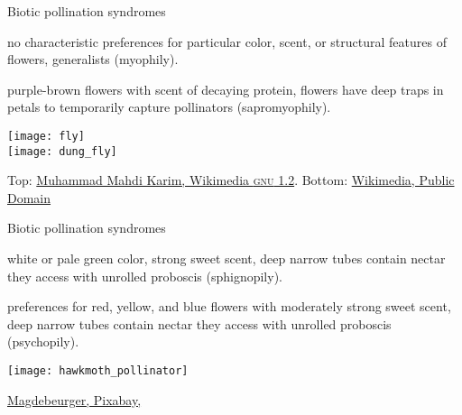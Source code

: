 \documentclass[t,hidelinks]{beamer}
\begin{document}
%
\begin{frame}[t]{Biotic pollination syndromes}

	\begin{multicols}{2}
	
	\hangpara {} no characteristic preferences for particular color, scent, or structural features of flowers, generalists (myophily).
	
	\hangpara {} purple-brown flowers with scent of decaying protein, flowers have deep traps in petals to temporarily capture pollinators (sapromyophily).

	\columnbreak
	
		\texttt{[image: fly]}\\
		\texttt{[image: dung\_fly]}
		
	\end{multicols}
	
	\vfilll
	
	\hfill \tiny Top: \href{https://en.wikipedia.org/wiki/File:Chrysomya_megacephala_male.jpg}{Muhammad Mahdi Karim, Wikimedia \textsc{gnu} 1.2}. Bottom: \href{https://commons.wikimedia.org/wiki/File:Dung_Fly_-_Scatophaga_stercoraria.jpg}{Wikimedia, Public Domain}
\end{frame}
%
\begin{frame}[t]{Biotic pollination syndromes}

	\begin{multicols}{2}
	\hangpara {} white or pale green color, strong sweet scent, deep narrow tubes contain nectar they access with unrolled proboscis (sphignopily).
	
	\hangpara {} preferences for red, yellow, and blue flowers with moderately strong sweet scent, deep narrow tubes contain nectar they access with unrolled proboscis (psychopily).
	
	
	\columnbreak
	
		\texttt{[image: hawkmoth\_pollinator]}
		
	\end{multicols}
	
	\vfilll
	
	\hfill \tiny \href{https://pixabay.com/en/hummingbird-hawk-moth-butterfly-542500/}{Magdebeurger, Pixabay, \cc{}}
\end{frame}
%
\end{document}
